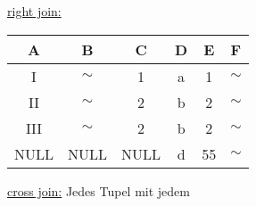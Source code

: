 \documentclass{article}
\begin{document}
\begin{table}[!htbp]
  \center
  \underline{right join:}
  \quad
  \quad
  \begin{tabular}{c|c|c|c|c|c}
    A            & B      & C    & D & E  & F      \\
    \hline
    \textrm{I}   & $\sim$ & 1    & a & 1  & $\sim$ \\
    \textrm{II}  & $\sim$ & 2    & b & 2  & $\sim$ \\
    \textrm{III} & $\sim$ & 2    & b & 2  & $\sim$ \\
    NULL         & NULL   & NULL & d & 55 & $\sim$ \\
  \end{tabular}
  \label{tab:joins:4}
\end{table}

\underline{cross join:}
\quad
Jedes Tupel mit jedem
\end{document}
